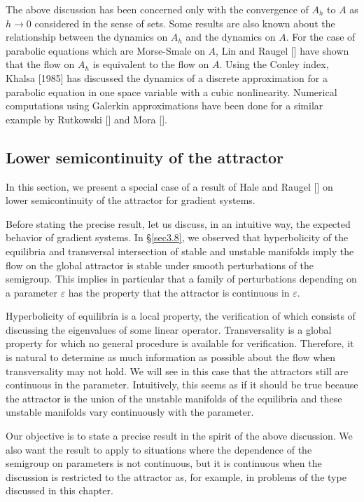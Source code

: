 \documentclass{surv-l}
\theoremstyle{plain}
\theoremstyle{definition}
\numberwithin{equation}{section}
\numberwithin{figure}{chapter}
\begin{document}
The above discussion has been concerned only with the convergence of $A_{h}$ to $A$ as $h\rightarrow 0$ considered in the sense of sets. Some results are also known about the relationship between the dynamics on $A_{h}$ and the dynamics on $A$. For the case of parabolic equations which are Morse-Smale on $A$, Lin and Raugel [\citeyear{1986lr}] have shown that the flow on $A_{h}$ is equivalent to the flow on $A$. Using the Conley index, Khalsa [1985] has discussed the dynamics of a discrete approximation for a parabolic equation in one space variable with a cubic nonlinearity. Numerical computations using Galerkin approximations have been done for a similar example by Rutkowski [\citeyear{1983r}] and Mora [\citeyear{1984m}].

\subsection{Lower semicontinuity of the attractor}\label{subsec4.10.4} In this section, we present a special case of a result of Hale and Raugel [\citeyear{1988hrb}] on lower semicontinuity of the attractor for gradient systems.

Before stating the precise result, let us discuss, in an intuitive way, the expected behavior of gradient systems. In \S\ref{sec3.8}, we observed that hyperbolicity of the equilibria and transversal intersection of stable and unstable manifolds imply the flow on the global attractor is stable under smooth perturbations of the semigroup. This implies in particular that a family of perturbations depending on a parameter $\varepsilon$ has the property that the attractor is continuous in $\varepsilon$.

Hyperbolicity of equilibria is a local property, the verification of which consists of discussing the eigenvalues of some linear operator. Transversality is a global property for which no general procedure is available for verification. Therefore, it is natural to determine as much information as possible about the flow when transversality may not hold. We will see in this case that the attractors still are continuous in the parameter. Intuitively, this seems as if it should be true because the attractor is the union of the unstable manifolds of the equilibria and these unstable manifolds vary continuously with the parameter.

Our objective is to state a precise result in the spirit of the above discussion. We also want the result to apply to situations where the dependence of the semigroup on parameters is not continuous, but it is continuous when the discussion is restricted to the attractor as, for example, in problems of the type discussed in this chapter.
\end{document}
